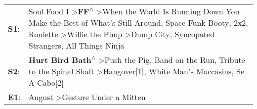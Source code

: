 \begin{supertabular}{p{0.03\textwidth}p{0.92\textwidth}}
 \textbf{S1}:  &  Soul Food I\textsuperscript{} \textgreater \enspace \textbf{FF\textsuperscript{$\wedge$}} \textgreater \enspace When the World Is Running Down You Make the Best of What's Still Around\textsuperscript{}, \enspace Space Funk Booty\textsuperscript{}, \enspace 2x2\textsuperscript{}, \enspace Roulette\textsuperscript{} \textgreater \enspace Willie the Pimp\textsuperscript{} \textgreater \enspace Dump City\textsuperscript{}, \enspace Syncopated Strangers\textsuperscript{}, \enspace All Things Ninja\textsuperscript{}  \enspace  \\
 \textbf{S2}:  &                                                                                                                                                                            \textbf{Hurt Bird Bath\textsuperscript{$\wedge$}} \textgreater \enspace Push the Pig\textsuperscript{}, \enspace Band on the Run\textsuperscript{}, \enspace Tribute to the Spinal Shaft\textsuperscript{} \textgreater \enspace Hangover[1]\textsuperscript{}, \enspace White Man's Moccasins\textsuperscript{}, \enspace Se A Cabo[2]\textsuperscript{}  \enspace  \\
 \textbf{E1}:  &                                                                                                                                                                                                                                                                                                                                                                                                                                              August\textsuperscript{} \textgreater \enspace Gesture Under a Mitten\textsuperscript{}  \enspace  \\
\end{supertabular}
